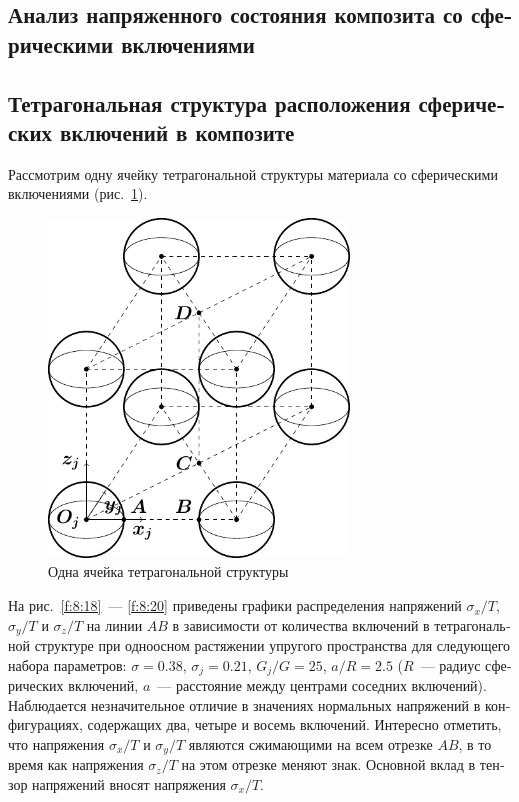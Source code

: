 \begin{russian}
\section{Анализ напряженного состояния композита со сферическими включениями}

\subsection{Тетрагональная структура расположения сферических включений в композите}

Рассмотрим одну ячейку тетрагональной структуры материала со сферическими включениями (рис.~\ref{f:8:52}).

\begin{figure}[h!]
\centering
\includegraphics[width=8cm]{spheres-cav-8.pdf}
\caption{Одна ячейка тетрагональной структуры}
\label{f:8:52}
\end{figure}

На рис.~\ref{f:8:18}~--- \ref{f:8:20} приведены графики распределения напряжений $\sigma_x/T$, $\sigma_y/T$ и $\sigma_z/T$ на линии $AB$ в зависимости от количества включений в тетрагональной структуре при одноосном растяжении упругого пространства для следующего набора параметров: $\sigma=0.38$, $\sigma_j=0.21$, $G_j/G=25$, $a/R=2.5$ ($R$~--- радиус сферических включений, $a$~--- расстояние между центрами соседних включений). Наблюдается незначительное отличие в значениях нормальных напряжений в конфигурациях, содержащих два, четыре и восемь включений. Интересно отметить, что напряжения $\sigma_x/T$ и $\sigma_y/T$ являются сжимающими на всем отрезке $AB$, в то время как напряжения $\sigma_z/T$ на этом отрезке меняют знак. Основной вклад в тензор напряжений вносят напряжения $\sigma_x/T$.


\end{russian}
